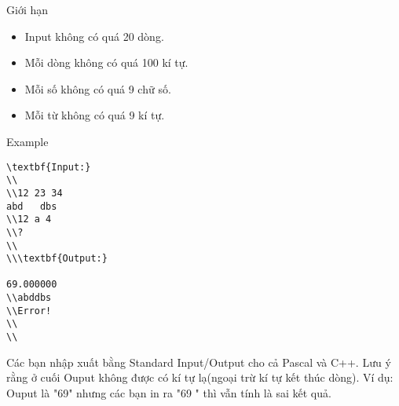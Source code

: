 Giới hạn  
\begin{itemize}
	\item     Input không có quá 20 dòng.   
	\item     Mỗi dòng không có quá 100 kí tự.   
	\item     Mỗi số không có quá 9 chữ số.   
	\item     Mỗi từ không có quá 9 kí tự.   
\end{itemize}
   Example  
\begin{verbatim}
\textbf{Input:}
\\
\\12 23 34
abd   dbs
\\12 a 4 
\\?
\\
\\\textbf{Output:}

69.000000
\\abddbs
\\Error! 
\\
\\\end{verbatim}

Các bạn nhập xuất bằng Standard Input/Output cho cả Pascal và C++. Lưu ý rằng ở cuối Ouput không được có kí tự lạ(ngoại trừ kí tự kết thúc dòng). Ví dụ: Ouput là "69" nhưng các bạn in ra "69 " thì vẫn tính là sai kết quả.
